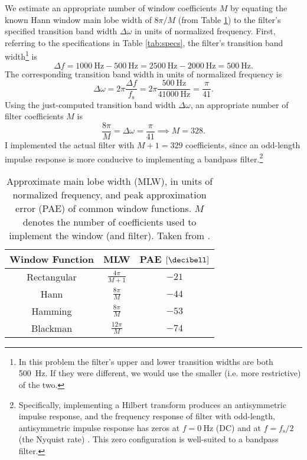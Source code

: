 We estimate an appropriate number of window coefficients $ M $ by equating the known Hann window main lobe width of $ 8 \pi/M $ (from Table \ref{tab:windows}) to the filter's specified transition band width $ \Delta \omega $ in units of normalized frequency. First, referring to the specifications in Table \ref{tab:specs}, the filter's transition band width\footnote{In this problem the filter's upper and lower transition widths are both \SI{500}{\hertz}. If they were different, we would use the smaller (i.e. more restrictive) of the two.} is
\begin{equation*}
    \Delta f = \SI{1000}{\hertz} - \SI{500}{\hertz} = \SI{2500}{\hertz} - \SI{2000}{\hertz} = \SI{500}{\hertz}.
\end{equation*}%
The corresponding transition band width in units of normalized frequency is
\begin{equation*}
    \Delta \omega = 2\pi \frac{\Delta f}{f_{\mathrm{s}}} = 2\pi \frac{\SI{500}{\hertz}}{\SI{41000}{\hertz}} = \frac{\pi}{41}.
\end{equation*}
Using the just-computed transition band width $ \Delta \omega $, an appropriate number of filter coefficients $ M $ is
\begin{equation*}
    \frac{8 \pi}{M} = \Delta \omega = \frac{\pi}{41} \implies M = 328.
\end{equation*}
I implemented the actual filter with $ M + 1 = 329 $ coefficients, since an odd-length impulse response is more conducive to implementing a bandpass filter.\footnote{Specifically, implementing a Hilbert transform produces an antisymmetric impulse response, and the frequency response of filter with odd-length, antisymmetric impulse response has zeros at $ f = \SI{0}{\hertz} $ (DC) and at $ f = f_{\mathrm{s}}/2 $ (the Nyquist rate) \cite{introdsp}. This zero configuration is well-suited to a bandpass filter.}

\begin{table}[htb!]
        \centering
        \begin{tabular}{|c|c|c|}
            \hline
            Window Function & MLW & PAE $ [\si{\decibell}] $\\
            \hline
            \hline {\rule{0pt}{2.6ex}} \hspace{-7pt}
            Rectangular & $ \frac{4\pi}{M + 1} $ & $ -21 $\\[0.5ex]
            Hann & $ \frac{8\pi}{M} $ & $ -44 $\\[0.5ex]
            Hamming & $ \frac{8\pi}{M} $ & $ -53 $\\[0.5ex]
            Blackman & $ \frac{12 \pi}{M} $ & $ -74 $\\[0.3ex]
            \hline
        \end{tabular}     
        \caption{Approximate main lobe width (MLW), in units of normalized frequency, and peak approximation error (PAE) of common window functions. $ M $ denotes the number of coefficients used to implement the window (and filter). Taken from \cite{proakis}.}
        \label{tab:windows}
\end{table}

